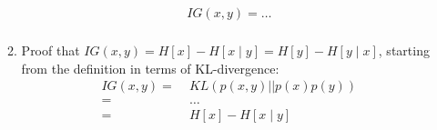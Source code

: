 \begin{enumerate}
\begin{enumerate}
	\begin{align*}
	IG(x,y)= \ldots \\
	\end{align*}
	
	\item Proof that $IG(x,y) = H[x] - H[x \mid y] = H[y] - H[y \mid x]$,
	starting from the definition in terms of KL-divergence:
	\begin{align*}
	IG(x,y) =&\; KL\left(p(x,y)||p(x)p(y)\right) \\
	=&\; \ldots \\
	=&\; H[x] - H[x \mid y]
	\end{align*}
\end{enumerate}

\end{enumerate}
